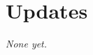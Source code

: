 \documentclass[11pt]{article}
\renewcommand{\_}{\char`\_}
\renewcommand{\{}{\char`\{}
\renewcommand{\}}{\char`\}}
\begin{document}
\section{Updates}
\label{sec:updates}
\hypertarget{sec:updates}{}

\emph{None yet.}

\end{document}
